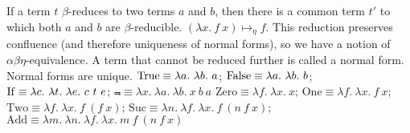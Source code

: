  If a term $t$ $\beta$-reduces to two terms $a$ and $b$, then there is a common term $t'$ to which both $a$ and $b$ are $\beta$-reducible.
 $(\lambda x.\ f\ x) \mapsto_\eta f$. This reduction preserves confluence (and therefore uniqueness of normal forms), so we have a notion of $\alpha\beta\eta$-equivalence.
 A term that cannot be reduced further is called a normal form. Normal forms are unique.
 $\True \equiv \lambda a.\ \lambda b.\ a$; 
$\operatorname{False} \equiv \lambda a.\ \lambda b.\ b$; 
$\operatorname{If} \equiv \lambda c.\ \lambda t.\ \lambda e.\ c\ t\ e$;
$\Not \equiv \lambda x.\ \lambda a.\ \lambda b.\ x\ b\ a$
 $\mathrm{Zero} \equiv \lambda f.\ \lambda x.\ x$; 
$\mathrm{One} \equiv \lambda f.\ \lambda x.\ f\ x$; 
$\mathrm{Two} \equiv \lambda f.\ \lambda x.\ f\ (f\ x)$; 
$\mathrm{Suc} \equiv \lambda n.\ \lambda f.\ \lambda x.\ f\ (n\ f\ x)$; 
$\mathrm{Add} \equiv \lambda m.\ \lambda n.\ \lambda f.\ \lambda x.\ m\ f\ (n\ f\ x)$